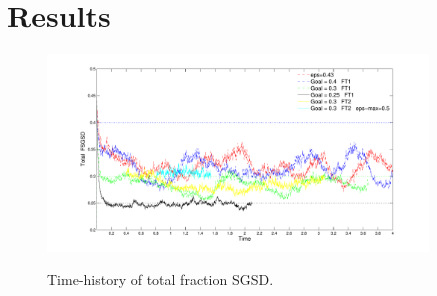 \chapter{Results}
\label{resultchapter}



%


\begin{figure}[t]
  \vspace{-10pt}
\begin{center}
  \includegraphics[width=0.9\textwidth]{figures/FSGSD_4.pdf}\\
\end{center}
  \vspace{-20pt}
  \caption{Time-history of total fraction SGSD.}
  \label{fig:FSGSD}
  \vspace{-10pt}
\end{figure}


